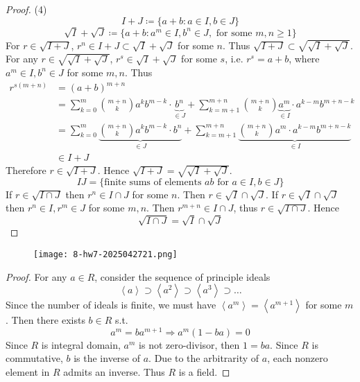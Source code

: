 \begin{proof}
(4)
\[
I+J\coloneqq \{ a+b:a\in I,b\in J \}
\]
\[
\sqrt{ I }+\sqrt{ J }\coloneqq \{ a+b:a^{m}\in I,b^{n}\in J,\text{ for some }m,n\geq 1 \}
\]
For $r\in \sqrt{ I+J }$, $r^{n}\in I+J\subset \sqrt{ I }+\sqrt{ J }$ for some $n$. Thus $\sqrt{ I+J }\subset \sqrt{ \sqrt{ I }+\sqrt{ J } }$. For any $r\in \sqrt{ \sqrt{ I }+\sqrt{ J } }$, $r^{s}\in \sqrt{ I }+\sqrt{ J }$ for some $s$, i.e. $r^{s}=a+b$, where $a^{m}\in I, b^{n}\in J$ for some $m,n$. Thus
\[
\begin{aligned}
r^{s (m+n)} & =(a+b)^{m+n} \\
 & =\sum_{k=0}^{m} \binom{m+n}{k}a^{k}b^{m-k}\cdot\underbrace{  b^{n} }_{ \in J }+\sum_{k=m+1}^{m+n} \binom{m+n}{k}\underbrace{  a^{m} }_{ \in I }\cdot a^{k-m}b^{m+n-k} \\
 & =\sum_{k=0}^{m} \underbrace{ \binom{m+n}{k}a^{k}b^{m-k}\cdot b^{n} }_{ \in J }+\sum_{k=m+1}^{m+n} \underbrace{ \binom{m+n}{k} a^{m}\cdot a^{k-m}b^{m+n-k}  }_{ \in I }  \\
 & \in I+J
\end{aligned}
\]
Therefore $r\in \sqrt{ I+J }$. Hence $\sqrt{ I+J }=\sqrt{ \sqrt{ I }+\sqrt{ J } }$.
\[
IJ=\{ \text{finite sums of elements }ab\text{ for }a\in I,b\in J \}
\]
If $r\in \sqrt{ I\cap J }$ then $r^{n}\in I\cap J$ for some $n$. Then $r\in \sqrt{ I }\cap \sqrt{ J }$. If $r\in \sqrt{ I }\cap \sqrt{ J }$ then $r^{n}\in I, r^{m}\in J$ for some $m,n$. Then $r^{m+n}\in I\cap J$, thus $r\in \sqrt{ I\cap J }$. Hence
\[
\sqrt{ I\cap J }=\sqrt{ I }\cap \sqrt{ J }
\]
\end{proof}

\begin{exercise}
\begin{figure}[H]
\centering
\texttt{[image: 8-hw7-2025042721.png]}
\label{}
\end{figure}
\end{exercise}
\begin{proof}
For any $a\in R$, consider the sequence of principle ideals
\[
\left< a \right> \supset\left< a^2 \right> \supset\left< a^3 \right> \supset\dots
\]
Since the number of ideals is finite, we must have $\left< a^{m} \right>= \left< a^{m+1} \right>$ for some $m$. Then there exists $b\in R$ s.t.
\[
a^{m}=b a^{m+1}\Rightarrow a^{m}(1-ba)=0
\]
Since $R$ is integral domain, $a^{m}$ is not zero-divisor, then $1=ba$. Since $R$ is commutative, $b$ is the inverse of $a$. Due to the arbitrarity of $a$, each nonzero element in $R$ admits an inverse. Thus $R$ is a field.
\end{proof}
